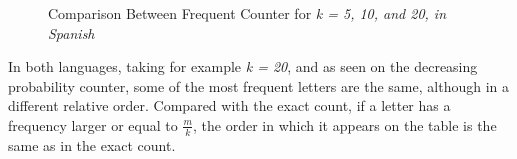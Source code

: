 \documentclass[...]{revdetua}
\begin{document}
\begin{figure}[!htb]
    \centering
    \qquad
    \qquad
    \caption{Comparison Between Frequent Counter for \textit{k = 5, 10, and 20, in Spanish}\label{comparison_frequent_es}}%
    \label{fig:example}%
\end{figure}

In both languages, taking for example \textit{k = 20}, and as seen on the decreasing probability counter, some of the most frequent letters are the same, although in a different relative order. Compared with the exact count, if a letter has a frequency larger or equal to \(\frac{m}{k}\), the order in which it appears on the table is the same as in the exact count.
\end{document}
